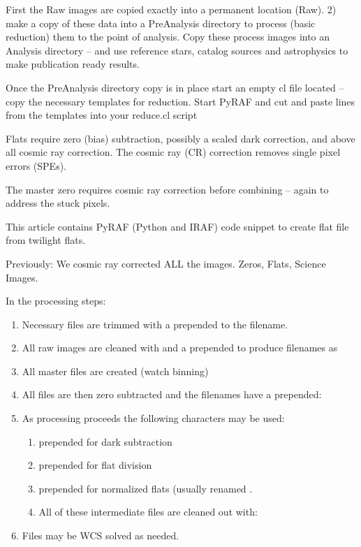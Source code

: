\documentclass[letter,11pt,oneside]{article}
\begin{document}
First the Raw images are copied exactly into a permanent location
(Raw). 2) make a copy of these data into a PreAnalysis directory to
process (basic reduction) them to the point of analysis. Copy these
process images into an  Analysis directory -- and use 
reference stars, catalog sources and astrophysics to make publication
ready results.

Once the PreAnalysis directory copy is in place start an empty
cl file located -- copy the
necessary templates for reduction. Start PyRAF and cut and paste
lines from the templates into your reduce.cl script

Flats require zero (bias) subtraction, possibly a scaled
dark correction, and above all cosmic ray correction.
The cosmic ray (CR) correction removes single pixel errors (SPEs).

The master zero requires cosmic ray correction before
combining -- again to address the stuck pixels.

This article contains PyRAF (Python and IRAF) code snippet to create
flat file from twilight flats.

Previously: We cosmic ray corrected ALL the images. Zeros, Flats,
Science Images. 

In the processing steps: 

\vspace{-.15cm}
\begin{enumerate}\addtolength{\itemsep}{-0.5\baselineskip}
   \item   Necessary files are trimmed with a {\color{verbcolor}{\verb#_t#}}
   prepended to the filename.
   \item   All raw images are cleaned with
{\color{verbcolor}{\verb#noao.imred.crutil.crmedian#}} and a
{\color{verbcolor}{\verb#c_#}} prepended to produce filenames as
{\color{verbcolor}{\verb#c_filename.fits#}}
   \item   All master files are created (watch binning)
   \item   All files are then zero subtracted and the filenames have
a {\color{verbcolor}{\verb#z_#}} prepended: {\color{verbcolor}{\verb#z_c_filename.fits#}}
   \item   As processing proceeds the following characters may be used:
\vspace{-.15cm}
\begin{enumerate}\addtolength{\itemsep}{-0.5\baselineskip}
   \item   {\color{verbcolor}{\verb#d_#}} prepended for dark subtraction
   \item   {\color{verbcolor}{\verb#f_#}} prepended for flat division
   \item   {\color{verbcolor}{\verb#n_#}} prepended for normalized flats (usually renamed
{\color{verbcolor}{\verb#flat_band_bin_master.fits#}}.
   \item   All of these intermediate files are cleaned out with:\\
{\color{verbcolor}{\verb#! (export LC_ALL=C; rm [a-z]_*fits 2> /dev/null;)#}}
\end{enumerate}
   \item   Files may be WCS solved as needed.
\end{enumerate}
\end{document}
